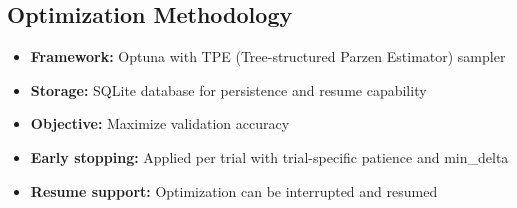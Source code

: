 \documentclass[11pt,a4paper]{article}
\begin{document}
\subsection{Optimization Methodology}

\begin{itemize}
    \item \textbf{Framework:} Optuna with TPE (Tree-structured Parzen Estimator) sampler
    \item \textbf{Storage:} SQLite database for persistence and resume capability
    \item \textbf{Objective:} Maximize validation accuracy
    \item \textbf{Early stopping:} Applied per trial with trial-specific patience and min\_delta
    \item \textbf{Resume support:} Optimization can be interrupted and resumed
\end{itemize}
\end{document}
